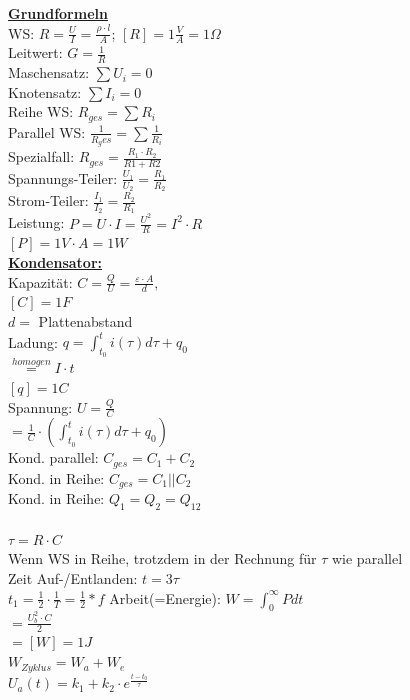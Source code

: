 \documentclass[11pt]{article}
\begin{document}
\begin{minipage}{0.45\textwidth}
\underline{\textbf{Grundformeln}}\\
WS: $R = \frac{U}{I} = \frac{\rho \cdot l}{A}$; $[R] = 1\frac{V}{A} =1 \Omega$ \\
Leitwert: $G = \frac{1}{R}$\\
Maschensatz: $\sum U_i = 0$\\
Knotensatz: $\sum I_i = 0$\\
Reihe WS: $R_{ges} = \sum R_i$\\
Parallel WS: $\frac{1}{R_ges} = \sum \frac{1}{R_i}$\\
\phantom{ss} Spezialfall: $R_{ges} = \frac{R_1 \cdot R_2}{R1+R2} $\\
Spannungs-Teiler: $\frac{U_1}{U_2} = \frac{R_1}{R_2}$\\
Strom-Teiler: $\frac{I_1}{I_2} = \frac{R_2}{R_1}$\\
Leistung: $P =U \cdot I = \frac{U^2}{R} = I^2 \cdot R $ \\
\phantom{ssssssssss} $[P] = 1V \cdot A =1 W$\\
\underline{\textbf{Kondensator:}}\\
Kapazität: $C = \frac{Q}{U} = \frac{\varepsilon \cdot A }{d},$\\
\phantom{ssssssssssii} $[C]=1F$\\
\phantom{sssssssssssii} $d =$ Plattenabstand\\
Ladung: $q = \int_{t_0}^t i(\tau) d\tau + q_0$\\
\phantom{sssssssis} $\stackrel{homogen}{=} I \cdot t$\\
\phantom{ssssssssssii} $[q]=1C$\\
Spannung: $U = \frac{Q}{C}$\\
\phantom{ssi} $= \frac{1}{C} \cdot (\int_{t_0}^t i(\tau) d\tau + q_0)$\\
Kond. parallel: $C_{ges} = C_1 + C_2$\\
Kond. in Reihe: $C_{ges} = C_1 || C_2$\\
Kond. in Reihe: $Q_1 = Q_2 = Q_{12}$\\
\\
$\tau = R \cdot C$\\
Wenn WS in Reihe, trotzdem in der Rechnung für $\tau$ wie parallel\\
Zeit Auf-/Entlanden: $t = 3\tau$\\
$t_1 = \frac{1}{2} \cdot \frac{1}{T} = \frac{1}{2} * f$
Arbeit(=Energie): $W = \int_0^\infty P dt$\\
\phantom{sssssssss} $= \frac{U_b^2 \cdot C}{2} $\\
\phantom{sssssssss} $= [W] = 1J $\\
$W_{Zyklus} = W_a + W_e$\\
$U_a(t) = k_1 + k_2 \cdot e^{\frac{t-t_0}{\tau}}$


\end{minipage}
\end{document}
